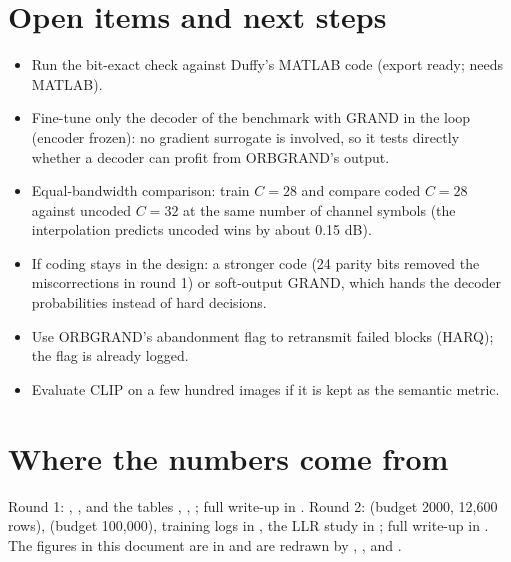 \documentclass{article}
\begin{document}
\section{Open items and next steps}

\begin{importantnote}[title={Next steps, cheapest first}]
\begin{itemize}
\item Run the bit-exact check against Duffy's MATLAB code (export ready; needs MATLAB).
\item Fine-tune only the decoder of the benchmark with GRAND in the loop (encoder frozen): no gradient
surrogate is involved, so it tests directly whether a decoder can profit from ORBGRAND's output.
\item Equal-bandwidth comparison: train $C=28$ and compare coded $C=28$ against uncoded $C=32$ at the
same number of channel symbols (the interpolation predicts uncoded wins by about 0.15 dB).
\item If coding stays in the design: a stronger code (24 parity bits removed the miscorrections in
round 1) or soft-output GRAND, which hands the decoder probabilities instead of hard decisions.
\item Use ORBGRAND's abandonment flag to retransmit failed blocks (HARQ); the flag is already logged.
\item Evaluate CLIP on a few hundred images if it is kept as the semantic metric.
\end{itemize}
\end{importantnote}

\section*{Where the numbers come from}

Round 1: , ,  and the tables
, , ; full write-up in
. Round 2:  (budget 2000, 12{,}600 rows),
 (budget 100{,}000), training logs in , the
LLR study in ; full write-up in . The
figures in this document are in  and are redrawn by
, ,  and
.
\end{document}
